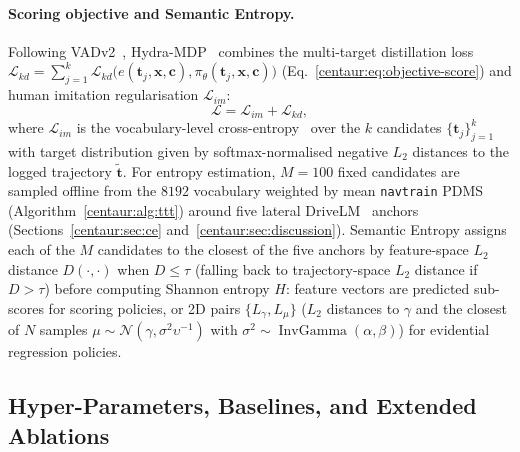 \paragraph{Scoring objective and Semantic Entropy.} Following VADv2~\cite{chen2024vadv2}, Hydra-MDP~\cite{li2024hydramdp} combines the multi-target distillation loss $\mathcal{L}_{kd} = \sum_{j=1}^{k} \mathcal{L}_{kd}\big(e(\mathbf{t}_j,\mathbf{x},\mathbf{c}), \allowbreak \pi_\theta(\mathbf{t}_j,\mathbf{x},\mathbf{c})\big)$ (Eq.~\eqref{centaur:eq:objective-score}) and human imitation regularisation $\mathcal{L}_{im}$:
\begin{equation}
  \label{centaur:eq:multi-score}
  \mathcal{L} = \mathcal{L}_{im} + \mathcal{L}_{kd},
\end{equation}
where $\mathcal{L}_{im}$ is the vocabulary-level cross-entropy~\cite{li2024hydramdp} over the $k$ candidates $\{\mathbf{t}_j\}_{j=1}^{k}$ with target distribution given by softmax-normalised negative $L_2$ distances to the logged trajectory $\tilde{\mathbf{t}}$. For entropy estimation, $M=100$ fixed candidates are sampled offline from the $8192$ vocabulary weighted by mean \texttt{navtrain} PDMS (Algorithm~\ref{centaur:alg:ttt}) around five lateral DriveLM~\cite{sima2024drivelm} anchors (Sections~\ref{centaur:sec:ce} and~\ref{centaur:sec:discussion}). Semantic Entropy assigns each of the $M$ candidates to the closest of the five anchors by feature-space $L_2$ distance $D(\cdot, \cdot)$ when $D \le \tau$ (falling back to trajectory-space $L_2$ distance if $D > \tau$) before computing Shannon entropy $H$: feature vectors are predicted sub-scores for scoring policies, or 2D pairs $\{L_{\gamma}, L_{\mu}\}$ ($L_2$ distances to $\gamma$ and the closest of $N$ samples $\mu \sim \mathcal{N}(\gamma, \sigma^2 \upsilon^{-1})$ with $\sigma^2 \sim \operatorname{InvGamma}(\alpha, \beta)$) for evidential regression policies.

\subsection{Hyper-Parameters, Baselines, and Extended Ablations}\label{centaur:app:exp}\label{centaur:app:baselines}\label{centaur:app:experiments}\label{centaur:app:leaderboard}\label{centaur:app:ablations}\label{centaur:app:qualitative}

